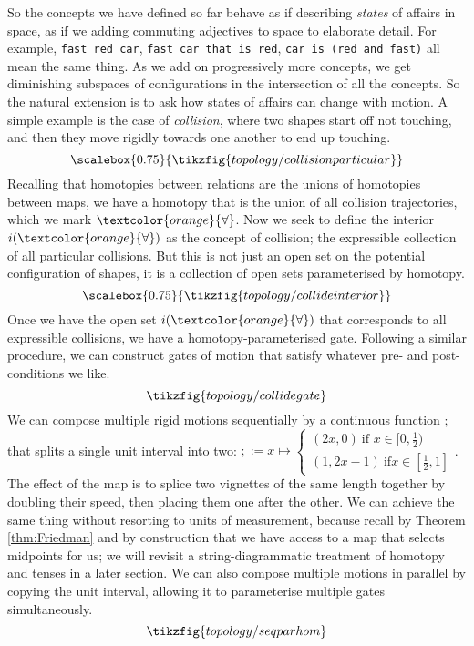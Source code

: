 So the concepts we have defined so far behave as if describing \emph{states} of affairs in space, as if we adding commuting adjectives to space to elaborate detail. For example, \texttt{fast red car}, \texttt{fast car that is red}, \texttt{car is (red and fast)} all mean the same thing. As we add on progressively more concepts, we get diminishing subspaces of configurations in the intersection of all the concepts. So the natural extension is to ask how states of affairs can change with motion. A simple example is the case of \emph{collision}, where two shapes start off not touching, and then they move rigidly towards one another to end up touching.
\[\scalebox{0.75}{\tikzfig{topology/collisionparticular}}\]
Recalling that homotopies between relations are the unions of homotopies between maps, we have a homotopy that is the union of all collision trajectories, which we mark $\textcolor{orange}{\forall}$. Now we seek to define the interior $i(\textcolor{orange}{\forall})$ as the concept of collision; the expressible collection of all particular collisions. But this is not just an open set on the potential configuration of shapes, it is a collection of open sets parameterised by homotopy.
\[\scalebox{0.75}{\tikzfig{topology/collideinterior}}\]
Once we have the open set $i(\textcolor{orange}{\forall})$ that corresponds to all expressible collisions, we have a homotopy-parameterised gate. Following a similar procedure, we can construct gates of motion that satisfy whatever pre- and post-conditions we like.
\[\tikzfig{topology/collidegate}\]
We can compose multiple rigid motions sequentially by a continuous function $\mathbf{;}$ that splits a single unit interval into two: $\mathbf{;} := x \mapsto \begin{cases} (2x,0) \ \text{if } x \in [0,\frac{1}{2}) \\ (1,2x - 1) \ \text{if} x \in [\frac{1}{2},1] \end{cases}$. The effect of the map is to splice two vignettes of the same length together by doubling their speed, then placing them one after the other. We can achieve the same thing without resorting to units of measurement, because recall by Theorem \ref{thm:Friedman} and by construction that we have access to a map that selects midpoints for us; we will revisit a string-diagrammatic treatment of homotopy and tenses in a later section. We can also compose multiple motions in parallel by copying the unit interval, allowing it to parameterise multiple gates simultaneously.
\[\tikzfig{topology/seqparhom}\]

